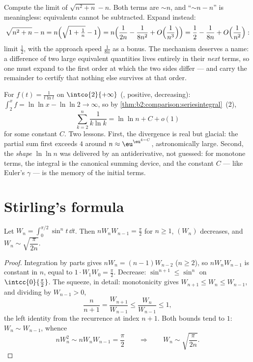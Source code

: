 \begin{example}\label{ex:b2:comparison:cancellation}
Compute the limit of $\sqrt{n^2 + n} - n$. Both terms are
$\sim n$, and ``$\sim n - n$'' is meaningless: equivalents
cannot be subtracted. Expand instead:
\[
\sqrt{n^2 + n} - n
= n\Bigl(\sqrt{1 + \tfrac1n} - 1\Bigr)
= n\Bigl(\frac{1}{2n} - \frac{1}{8n^2} +
O\Bigl(\frac1{n^3}\Bigr)\Bigr)
= \frac12 - \frac{1}{8n} + O\Bigl(\frac1{n^2}\Bigr) :
\]
limit $\frac12$, with the approach speed $\frac1{8n}$ as a
bonus. The mechanism deserves a name: a difference of two large
equivalent quantities lives entirely in their \emph{next}
terms, so one must expand to the first order at which the two
sides differ --- and carry the remainder to certify that
nothing else survives at that order.
\end{example}

\begin{example}\label{ex:b2:comparison:loglog}
For $f(t) = \frac{1}{t\ln t}$ on $\intco{2}{+\infty}$
(, positive, decreasing): $\int_2^x f = \ln\ln x -
\ln\ln 2 \to \infty$, so by
\cref{thm:b2:comparison:seriesintegral}~(2),
\[
\sum_{k=2}^{n}\frac{1}{k\ln k} = \ln\ln n + C + o(1)
\]
for some constant $C$. Two lessons. First, the divergence is
real but glacial: the partial sum first exceeds $4$ around $n
\approx \eu^{\eu^{4 - C}}$, astronomically large. Second, the
\emph{shape} $\ln\ln n$ was delivered by an antiderivative, not
guessed: for monotone terms, the integral is the canonical
summing device, and the constant $C$ --- like Euler's $\gamma$
--- is the memory of the initial terms.
\end{example}

\section{Stirling's formula}

\begin{lemma}\label{lem:b2:comparison:wallis}
Let $W_n = \int_0^{\pi/2} \sin^n t\,\dd t$. Then $nW_nW_{n-1} =
\frac\pi2$ for $n \geq 1$, $(W_n)$ decreases, and $W_n \sim
\sqrt{\dfrac{\pi}{2n}}$.
\end{lemma}

\begin{proof}
Integration by parts gives $nW_n = (n-1)W_{n-2}$ ($n \geq 2$), so
$nW_nW_{n-1}$ is constant in $n$, equal to $1 \cdot W_1 W_0 =
\frac\pi2$. Decrease: $\sin^{n+1} \leq \sin^n$ on
$\intcc{0}{\frac\pi2}$. The squeeze, in detail: monotonicity
gives $W_{n+1} \leq W_n \leq W_{n-1}$, and dividing by $W_{n-1}
> 0$,
\[
\frac{n}{n+1} = \frac{W_{n+1}}{W_{n-1}} \leq
\frac{W_n}{W_{n-1}} \leq 1 ,
\]
the left identity from the recurrence at index $n + 1$. Both
bounds tend to $1$: $W_n \sim W_{n-1}$, whence
\[
nW_n^2 \sim nW_nW_{n-1} = \frac\pi2
\qquad\Longrightarrow\qquad
W_n \sim \sqrt{\frac{\pi}{2n}} .
\]
\end{proof}

